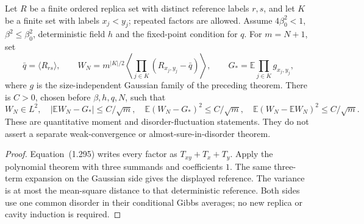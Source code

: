 \begin{theorem}
\label{thm:sg-tal:centered-overlap-polynomial}
\leanok
{}
Let $R$ be a finite ordered replica set with distinct reference labels $r,s$, and let
$K$ be a finite set with labels $x_j<y_j$; repeated factors are allowed. Assume
$4\beta_0^2<1$, $\beta^2\le\beta_0^2$, deterministic field $h$ and the fixed-point
condition for $q$. For $m=N+1$, set
\[
 \bar q=\langle R_{rs}\rangle,\qquad
 W_N=m^{|K|/2}\left\langle\prod_{j\in K}(R_{x_j,y_j}-\bar q)\right\rangle,\qquad
 G_* =\mathbb E\prod_{j\in K}g_{x_j,y_j},
\]
where $g$ is the size-independent Gaussian family of the preceding theorem.
There is $C>0$, chosen before $\beta,h,q,N$, such that
\[
 W_N\in L^2,\quad |\mathbb EW_N-G_*|\le C/\sqrt m,\quad
 \mathbb E(W_N-G_*)^2\le C/\sqrt m,\quad
 \mathbb E(W_N-\mathbb EW_N)^2\le C/\sqrt m.
\]
These are quantitative moment and disorder-fluctuation statements. They do not
assert a separate weak-convergence or almost-sure-in-disorder theorem.
\end{theorem}
\begin{proof}
\leanok
Equation~(1.295) writes every factor as $T_{xy}+T_x+T_y$. Apply the polynomial theorem
with three summands and coefficients $1$. The same three-term expansion on the
Gaussian side gives the displayed reference. The variance is at most the mean-square
distance to that deterministic reference. Both sides use one common disorder in their
conditional Gibbs averages; no new replica or cavity induction is required.
\end{proof}

